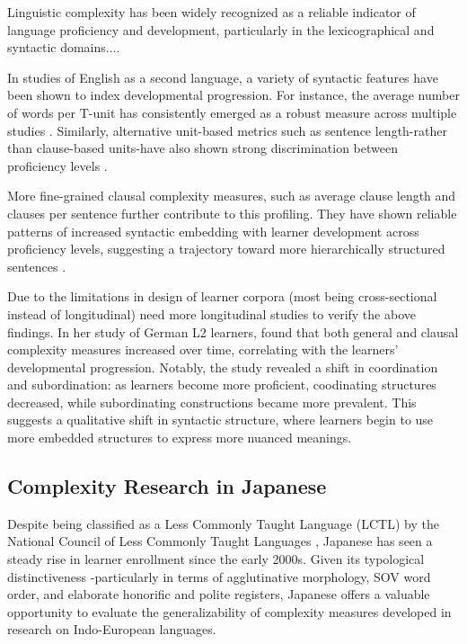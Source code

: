 Linguistic complexity has been widely recognized as a reliable indicator of language proficiency and development,
particularly in the lexicographical and syntactic domains....

In studies of English as a second language, a variety of syntactic features have been shown to index developmental
progression. For instance, the average number of words per T-unit has consistently emerged as a robust measure
across multiple studies \citep{Ortega2003,Wolfe1998,Lu2011, Lu2010, Iwashita2006}. Similarly, alternative unit-based
metrics such as sentence length-rather than clause-based units-have also shown strong discrimination between
proficiency levels \citep{Ortega2003, Lu2011}.

More fine-grained clausal complexity measures, such as average clause length and clauses per sentence further
contribute to this profiling. They have shown reliable patterns of increased syntactic embedding with learner
development across proficiency levels, suggesting a trajectory toward more hierarchically structured sentences \citep{Ortega2003, Lu2011}.

Due to the limitations in design of learner corpora (most being cross-sectional instead of longitudinal) need more
longitudinal studies to verify the above findings. In her study of German L2 learners, \cite{Vyatkina2012} found
that both general and clausal complexity measures increased over time, correlating with the learners' developmental
progression. Notably, the study revealed a shift in coordination and subordination: as learners become more
proficient, coodinating structures decreased, while subordinating constructions became more prevalent. This suggests
a qualitative shift in syntactic structure, where learners begin to use more embedded structures to express more
nuanced
meanings.


\subsection{Complexity Research in Japanese}
Despite being classified as a Less Commonly Taught Language (LCTL) by the National Council of Less Commonly Taught
Languages \cite{ncolctl2025}, Japanese has seen a steady rise in learner enrollment since the early 2000s. Given its
typological distinctiveness -particularly in terms of agglutinative morphology, SOV word order, and elaborate
honorific and polite registers, Japanese offers a valuable opportunity to evaluate the generalizability of
complexity measures developed in research on Indo-European languages.

